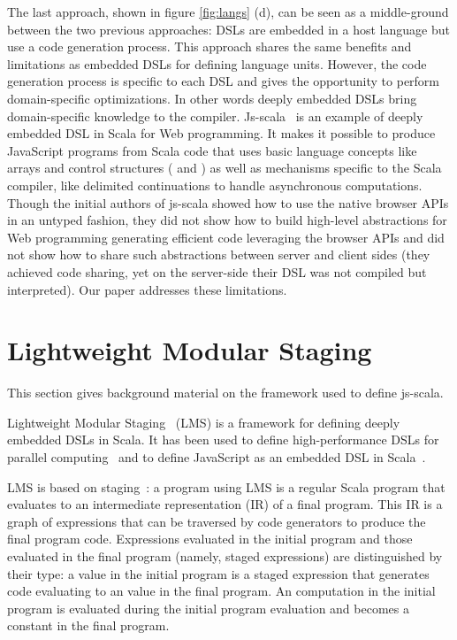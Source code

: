 \documentclass[preprint]{sigplanconf}
\begin{document}
The last approach, shown in figure \ref{fig:langs} (d), can be seen as a middle-ground between the
two previous approaches: DSLs are embedded in a host language but use a code generation process.
This approach shares the same benefits and limitations as embedded DSLs for defining language units.
However, the code generation process is specific to each DSL and gives the opportunity to perform
domain-specific optimizations. In other words deeply embedded DSLs bring domain-specific knowledge
to the compiler. Js-scala~\cite{Kossakowski12_JsDESL} is an example of deeply embedded DSL in Scala
for Web programming. It makes it possible to produce JavaScript programs from Scala code that uses
basic language concepts like arrays and control structures ( and ) as well as
mechanisms specific to the Scala compiler, like delimited continuations to handle asynchronous
computations. Though the initial authors of js-scala showed how to use the native browser APIs in an
untyped fashion, they did not show how to build high-level abstractions for Web programming
generating efficient code leveraging the browser APIs and did not show how to share such
abstractions between server and client sides (they achieved code sharing, yet on the server-side
their DSL was not compiled but interpreted). Our paper addresses these limitations.

\section{Lightweight Modular Staging}
\label{sec:lms}

This section gives background material on the framework used to define js-scala.

Lightweight Modular Staging~\cite{Rompf12_LMSThesis, Rompf12_LMS} (LMS) is a framework for defining
deeply embedded DSLs in Scala. It has been used to define high-performance DSLs for parallel
computing~\cite{Brown11_Parallel} and to define JavaScript as an embedded DSL in
Scala~\cite{Kossakowski12_JsDESL}.

LMS is based on staging~\cite{Jorring1986_Staging}: a program using LMS is a regular Scala program
that evaluates to an intermediate representation (IR) of a final program. This IR is a graph of
expressions that can be traversed by code generators to produce the final program code. Expressions
evaluated in the initial program and those evaluated in the final program (namely, staged
expressions) are distinguished by their type: a  value in the initial program is a
staged expression that generates code evaluating to an  value in the final program. An
 computation in the initial program is evaluated during the initial program evaluation and
becomes a constant in the final program.
\end{document}

